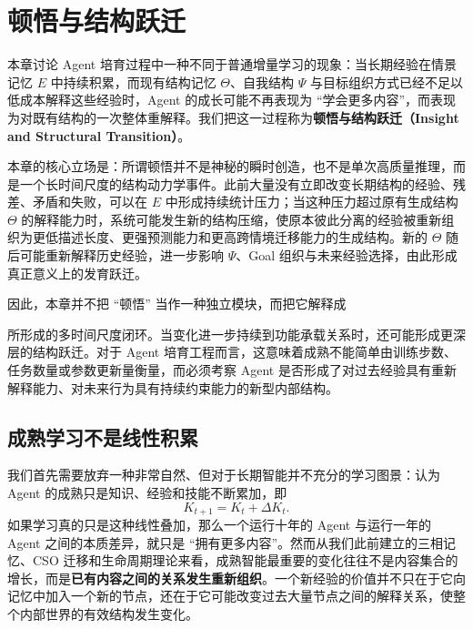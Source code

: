 
\chapter{顿悟与结构跃迁}
\label{chap:developmental-phase-transition}

\begin{chapterlead}
本章讨论 Agent 培育过程中一种不同于普通增量学习的现象：当长期经验在情景记忆 $E$ 中持续积累，而现有结构记忆 $\Theta$、自我结构 $\Psi$ 与目标组织方式已经不足以低成本解释这些经验时，Agent 的成长可能不再表现为 ``学会更多内容''，而表现为对既有结构的一次整体重解释。我们把这一过程称为\textbf{顿悟与结构跃迁（Insight and Structural Transition）}。

本章的核心立场是：所谓顿悟并不是神秘的瞬时创造，也不是单次高质量推理，而是一个长时间尺度的结构动力学事件。此前大量没有立即改变长期结构的经验、残差、矛盾和失败，可以在 $E$ 中形成持续统计压力；当这种压力超过原有生成结构 $\Theta$ 的解释能力时，系统可能发生新的结构压缩，使原本彼此分离的经验被重新组织为更低描述长度、更强预测能力和更高跨情境迁移能力的生成结构。新的 $\Theta$ 随后可能重新解释历史经验，进一步影响 $\Psi$、Goal 组织与未来经验选择，由此形成真正意义上的发育跃迁。

因此，本章并不把 ``顿悟'' 当作一种独立模块，而把它解释成
\begin{statementbox}
\centering
{}
\end{statementbox}
所形成的多时间尺度闭环。当变化进一步持续到功能承载关系时，还可能形成更深层的结构跃迁。对于 Agent 培育工程而言，这意味着成熟不能简单由训练步数、任务数量或参数更新量衡量，而必须考察 Agent 是否形成了对过去经验具有重新解释能力、对未来行为具有持续约束能力的新型内部结构。
\end{chapterlead}

\section{成熟学习不是线性积累}

我们首先需要放弃一种非常自然、但对于长期智能并不充分的学习图景：认为 Agent 的成熟只是知识、经验和技能不断累加，即
\[
K_{t+1}=K_t+\Delta K_t .
\]
如果学习真的只是这种线性叠加，那么一个运行十年的 Agent 与运行一年的 Agent 之间的本质差异，就只是 ``拥有更多内容''。然而从我们此前建立的三相记忆、CSO 迁移和生命周期理论来看，成熟智能最重要的变化往往不是内容集合的增长，而是\textbf{已有内容之间的关系发生重新组织}。一个新经验的价值并不只在于它向记忆中加入一个新的节点，还在于它可能改变过去大量节点之间的解释关系，使整个内部世界的有效结构发生变化。

